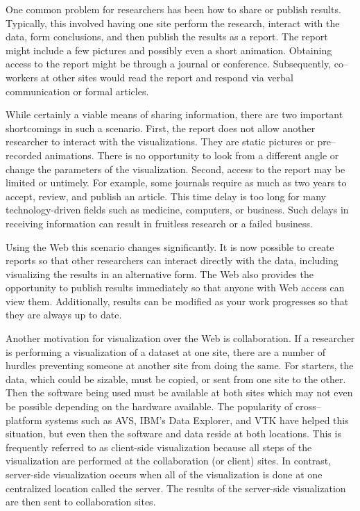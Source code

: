 One common problem for researchers has been how to share or publish results. Typically, this involved having one site perform the research, interact with the data, form conclusions, and then publish the results as a report. The report might include a few pictures and possibly even a short animation. Obtaining access to the report might be through a journal or conference. Subsequently, co--workers at other sites would read the report and respond via verbal communication or formal articles.

While certainly a viable means of sharing information, there are two important shortcomings in such a scenario. First, the report does not allow another researcher to interact with the visualizations. They are static pictures or pre--recorded animations. There is no opportunity to look from a different angle or change the parameters of the visualization. Second, access to the report may be limited or untimely. For example, some journals require as much as two years to accept, review, and publish an article. This time delay is too long for many technology-driven fields such as medicine, computers, or business. Such delays in receiving information can result in fruitless research or a failed business.

Using the Web this scenario changes significantly. It is now possible to create reports so that other researchers can interact directly with the data, including visualizing the results in an alternative form. The Web also provides the opportunity to publish results immediately so that anyone with Web access can view them. Additionally, results can be modified as your work progresses so that they are always up to date.

Another motivation for visualization over the Web is collaboration. If a researcher is performing a visualization of a dataset at one site, there are a number of hurdles preventing someone at another site from doing the same. For starters, the data, which could be sizable, must be copied, or sent from one site to the other. Then the software being used must be available at both sites which may not even be possible depending on the hardware available. The popularity of cross--platform systems such as AVS, IBM’s Data Explorer, and VTK have helped this situation, but even then the software and data reside at both locations. This is frequently referred to as client-side visualization because all steps of the visualization are performed at the collaboration (or client) sites. In contrast, server-side visualization occurs when all of the visualization is done at one centralized location called the server. The results of the server-side visualization are then sent to collaboration sites.

